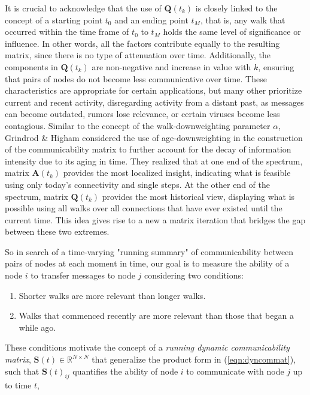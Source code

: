 It is crucial to acknowledge that the use of $\mathbf{Q}(t_k)$ is closely linked to the concept of a starting point $t_0$ and an ending point $t_M$, that is, any walk that occurred within the time frame of $t_0$ to $t_M$ holds the same level of significance or influence. In other words, all the factors contribute equally to the resulting matrix, since there is no type of attenuation over time. Additionally, the components in $\mathbf{Q}(t_k)$ are non-negative and increase in value with $k$, ensuring that pairs of nodes do not become less communicative over time. These characteristics are appropriate for certain applications, but many other prioritize current and recent activity, disregarding activity from a distant past, as messages can become outdated, rumors lose relevance, or certain viruses become less contagious. Similar to the concept of the walk-downweighting parameter $\alpha$, Grindrod \& Higham \cite{grindrod2013matrix} considered the use of age-downweighting in the construction of the communicability matrix to further account for the decay of information intensity due to its
aging in time. They realized that at one end of the spectrum, matrix $\mathbf{A}(t_k)$ provides the most localized insight, indicating what is feasible using only today's connectivity and single steps. At the other end of the spectrum, matrix $\mathbf{Q}(t_k)$ provides the most historical view, displaying what is possible using all walks over all connections that have ever existed until the current time. This idea gives rise to a new a matrix iteration that bridges the gap between these two extremes.

So in search of a time-varying "running summary" of communicability between pairs of nodes at each moment in time, our goal is to measure the ability of a node $i$ to transfer messages to node $j$ considering two conditions: 
\begin{enumerate}[label=(\roman*)]
  \item Shorter walks are more relevant than longer walks.
  \item Walks that commenced recently are more relevant than those that began a while ago.
\end{enumerate}

 These conditions motivate the concept of a \textit{running dynamic communicability matrix}, $\mathbf{S}(t)\in\mathbb{R}^{N\times N}$ that generalize the product form in (\ref{eqn:dyncommat}), such that $\mathbf{S}(t)_{ij}$ quantifies the ability of node $i$ to communicate with node $j$ up to time $t$,
 
